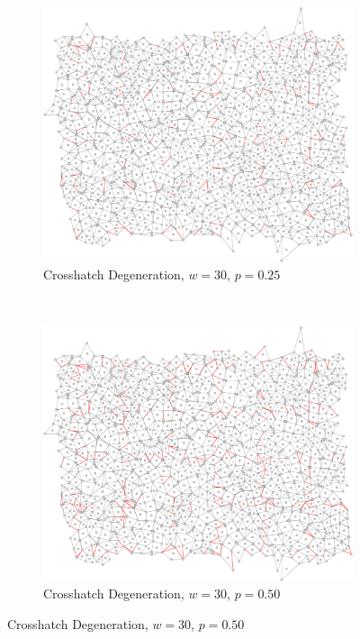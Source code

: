 \documentclass[a4paper,11pt]{article}
\begin{document}
\begin{figure}[htp]
\centering
\begin{subfigure}[t]{0.45\textwidth}
  \includegraphics[width=\textwidth]{ch6_figs/cross_hatch_p25_w30}
  \caption{Crosshatch Degeneration, $w=30$, $p=0.25$}

\end{subfigure}
~
\begin{subfigure}[t]{0.45\textwidth}
  \centering
  \includegraphics[width=\textwidth]{ch6_figs/cross_hatch_p50_w30}
  \caption{Crosshatch Degeneration, $w=30$, $p=0.50$}


\end{subfigure}
\end{figure}
\end{document}

